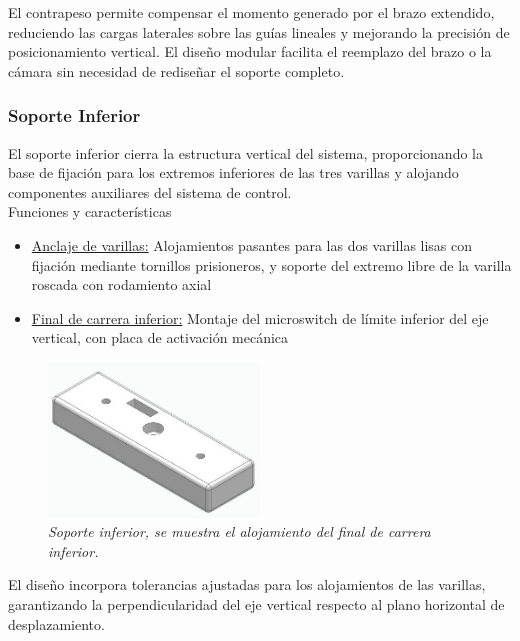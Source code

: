 El contrapeso permite compensar el momento generado por el brazo extendido, reduciendo las cargas laterales sobre las guías lineales y mejorando la precisión de posicionamiento vertical. El diseño modular facilita el reemplazo del brazo o la cámara sin necesidad de rediseñar el soporte completo.

\subsubsection{Soporte Inferior}

El soporte inferior cierra la estructura vertical del sistema, proporcionando la base de fijación para los extremos inferiores de las tres varillas y alojando componentes auxiliares del sistema de control.\\

Funciones y características

\begin{itemize}[label=$\bullet$]
    \item \underline{Anclaje de varillas:} Alojamientos pasantes para las dos varillas lisas con fijación mediante tornillos prisioneros, y soporte del extremo libre de la varilla roscada con rodamiento axial
    \item \underline{Final de carrera inferior:} Montaje del microswitch de límite inferior del eje vertical, con placa de activación mecánica
\end{itemize}

\begin{figure}[H]
    \centering
    \includegraphics[width=0.5\textwidth]{img/InferiorReal_simplificado_vista.jpg}
    \caption{\textit{Soporte inferior, se muestra el alojamiento del final de carrera inferior.}}
    \label{fig:soporte_inferior_real}
\end{figure}

El diseño incorpora tolerancias ajustadas para los alojamientos de las varillas, garantizando la perpendicularidad del eje vertical respecto al plano horizontal de desplazamiento.

